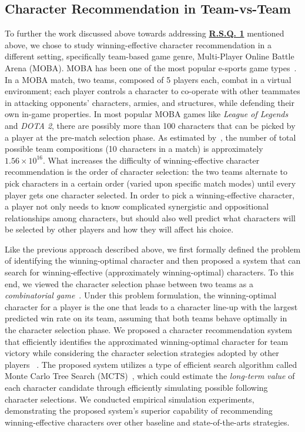 \subsection{Character Recommendation in Team-vs-Team}\label{sec:thesis_overview:character_recom}

To further the work discussed above towards addressing \hyperref[rq1]{\textbf{R.S.Q. 1}} mentioned above, we chose to study winning-effective character recommendation in a different setting, specifically team-based game genre, Multi-Player Online Battle Arena (MOBA). MOBA has been one of the most popular e-sports game types~\citep{superdata2016}. In a MOBA match, two teams, composed of 5 players each, combat in a virtual environment; each player controls a character to co-operate with other teammates in attacking opponents' characters, armies, and structures, while defending their own in-game properties. In most popular MOBA games like \textit{League of Legends} and \textit{DOTA 2}, there are possibly more than 100 characters that can be picked by a player at the pre-match selection phase. As estimated by~\textcite{hanke2017reco}, the number of total possible team compositions (10 characters in a match) is approximately $1.56 \times 10^{16}$. What increases the difficulty of winning-effective character recommendation is the order of character selection: the two teams alternate to pick characters in a certain order (varied upon specific match modes) until every player gets one character selected. In order to pick a winning-effective character, a player not only needs to know complicated synergistic and oppositional relationships among characters, but should also well predict what characters will be selected by other players and how they will affect his choice. 

Like the previous approach described above, we first formally defined the problem of identifying the winning-optimal character and then proposed a system that can search for winning-effective (approximately winning-optimal) characters. To this end, we viewed the character selection phase between two teams as a \textit{combinatorial game}~\citep{browne2012survey}. Under this problem formulation, the winning-optimal character for a player is the one that leads to a character line-up with the largest predicted win rate on its team, assuming that both teams behave optimally in the character selection phase. We proposed a character recommendation system that efficiently identifies the approximated winning-optimal character for team victory while considering the character selection strategies adopted by other players ~\citep{chen2018draft}. The proposed system utilizes a type of efficient search algorithm called Monte Carlo Tree Search (MCTS)~\citep{coulom2006efficient}, which could estimate the \textit{long-term value} of each character candidate through efficiently simulating possible following character selections. We conducted empirical simulation experiments, demonstrating the proposed system's superior capability of recommending winning-effective characters over other baseline and state-of-the-arts strategies. 

